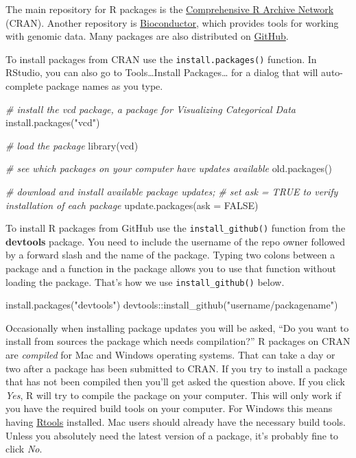 \documentclass[
]{book}
\newenvironment{Shaded}{\begin{snugshade}}{\end{snugshade}}
\newcommand{\AttributeTok}[1]{\textcolor[rgb]{0.77,0.63,0.00}{#1}}
\newcommand{\CommentTok}[1]{\textcolor[rgb]{0.56,0.35,0.01}{\textit{#1}}}
\newcommand{\ConstantTok}[1]{\textcolor[rgb]{0.00,0.00,0.00}{#1}}
\newcommand{\FunctionTok}[1]{\textcolor[rgb]{0.00,0.00,0.00}{#1}}
\newcommand{\NormalTok}[1]{#1}
\newcommand{\SpecialCharTok}[1]{\textcolor[rgb]{0.00,0.00,0.00}{#1}}
\newcommand{\StringTok}[1]{\textcolor[rgb]{0.31,0.60,0.02}{#1}}
\begin{document}
The main repository for R packages is the \href{https://cran.r-project.org/}{Comprehensive R Archive Network} (CRAN). Another repository is \href{https://www.bioconductor.org/}{Bioconductor}, which provides tools for working with genomic data. Many packages are also distributed on \href{https://github.com/}{GitHub}.

To install packages from CRAN use the \texttt{install.packages()} function. In RStudio, you can also go to Tools\ldots Install Packages\ldots{} for a dialog that will auto-complete package names as you type.

\begin{Shaded}
\begin{Highlighting}[]
\CommentTok{\# install the vcd package, a package for Visualizing Categorical Data}
\FunctionTok{install.packages}\NormalTok{(}\StringTok{"vcd"}\NormalTok{)}

\CommentTok{\# load the package}
\FunctionTok{library}\NormalTok{(vcd)}

\CommentTok{\# see which packages on your computer have updates available}
\FunctionTok{old.packages}\NormalTok{()}

\CommentTok{\# download and install available package updates;}
\CommentTok{\# set ask = TRUE to verify installation of each package}
\FunctionTok{update.packages}\NormalTok{(}\AttributeTok{ask =} \ConstantTok{FALSE}\NormalTok{)}
\end{Highlighting}
\end{Shaded}

To install R packages from GitHub use the \texttt{install\_github()} function from the \textbf{devtools} package. You need to include the username of the repo owner followed by a forward slash and the name of the package. Typing two colons between a package and a function in the package allows you to use that function without loading the package. That's how we use \texttt{install\_github()} below.

\begin{Shaded}
\begin{Highlighting}[]
\FunctionTok{install.packages}\NormalTok{(}\StringTok{"devtools"}\NormalTok{)}
\NormalTok{devtools}\SpecialCharTok{::}\FunctionTok{install\_github}\NormalTok{(}\StringTok{"username/packagename"}\NormalTok{)}
\end{Highlighting}
\end{Shaded}

Occasionally when installing package updates you will be asked, ``Do you want to install from sources the package which needs compilation?'' R packages on CRAN are \emph{compiled} for Mac and Windows operating systems. That can take a day or two after a package has been submitted to CRAN. If you try to install a package that has not been compiled then you'll get asked the question above. If you click \emph{Yes}, R will try to compile the package on your computer. This will only work if you have the required build tools on your computer. For Windows this means having \href{https://cran.r-project.org/bin/windows/Rtools/}{Rtools} installed. Mac users should already have the necessary build tools. Unless you absolutely need the latest version of a package, it's probably fine to click \emph{No}.
\end{document}
